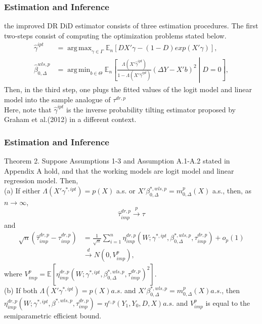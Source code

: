 \documentclass{beamer}
\DeclareMathOperator*{\argmax}{arg\,\max}
\DeclareMathOperator*{\argmin}{arg\,\min}
\begin{document}
\begin{frame}\frametitle{Estimation and Inference}
    the improved DR DiD estimator consists of three estimation procedures. The first two-steps consist of computing the optimization problems stated below.
    \begin{align*}
        \widehat{\gamma}^{ipt} &= \argmax_{\gamma \in \Gamma} \mathbb{E}_{n}[DX'\gamma - (1-D)exp(X'\gamma)], \\
        \widehat{\beta}^{wls, p}_{0, \Delta} &= \argmin_{b \in \Theta} \mathbb{E}_{n}\left[\frac{\Lambda(X'\widehat{\gamma}^{ipt})}{1 - \Lambda(X'\widehat{\gamma}^{ipt})}(\Delta Y - X'b)^{2} \middle|D = 0 \right],
    \end{align*}
    Then, in the third step, one plugs the fitted values of the logit model and linear model into the sample analogue of $\tau^{dr, p}$ \\
    Here, note that $\widehat{\gamma}^{ipt}$ is the inverse probability tilting estimator proposed by Graham et al.(2012) in a different context.
\end{frame}

\begin{frame}\frametitle{Estimation and Inference}
    \begin{block}{Theorem 2.}
        \footnotesize
        Suppose Assumptions 1-3 and Assumption A.1-A.2 stated in Appendix A hold, and that the working models are logit model and linear regression model. Then,
        \\(a) If either $\Lambda(X'\gamma^{\ast,ipt}) = p(X)$ a.s. or $X'\beta^{\ast, wls, p}_{0,\Delta} = m^{p}_{0,\Delta}(X)$ a.s., then, as $n \rightarrow \infty$,
        $$
            \widehat{\tau}^{dr,p}_{imp} \overset{p}{\to} \tau
        $$
        and
        \normalsize
        \footnotesize
        \begin{align*}
            \sqrt{n}(\widehat{\tau}^{dr,p}_{imp} - \tau^{dr,p}_{imp})
            &= 
            \frac{1}{\sqrt{n}}\sum_{i = 1}^{n} \eta^{dr,p}_{imp}(W;\gamma^{\ast,ipt}, \beta^{\ast,wls,p}_{0,\Delta},\tau^{dr,p}_{imp}) + o_{p}(1)
            \\ & \overset{d}{\to} N(0,V^{p}_{imp}),
        \end{align*}
        \normalsize
        \footnotesize
        where $V^{p}_{imp} = \mathbb{E}\left[\eta^{dr,p}_{imp}(W;\gamma^{\ast, ipt},\beta^{\ast, wls, p}_{0, \Delta}, \tau^{dr, p}_{imp})^{2}\right]$.
        \normalsize
        \footnotesize
        \\(b) If both $\Lambda(X'\gamma^{\ast,ipt}) = p(X) a.s.$ and $X'\beta^{\ast, wls, p}_{0, \Delta} = m^{p}_{0, \Delta}(X) a.s.$, then $\eta^{dr, p}_{imp}(W;\gamma^{\ast, ipt},\beta^{\ast, wls, p}, \tau^{dr,p}_{imp}) = \eta^{e,p}(Y_{1}, Y_{0}, D, X) a.s.$ and $V^{p}_{imp}$ is equal to the semiparametric efficient bound. 
        \normalsize
    \end{block}
\end{frame}
\end{document}
